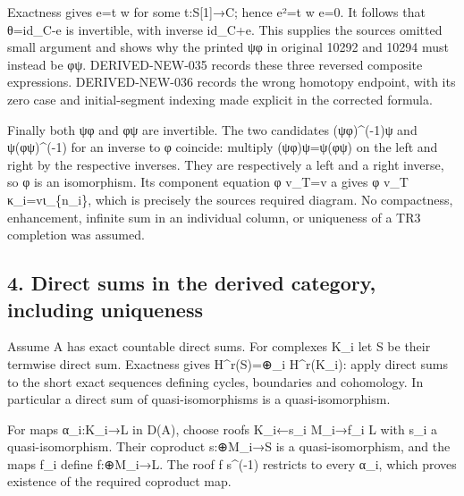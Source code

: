Exactness gives e\allowbreak{}=t w for some t:\allowbreak{}S[1]\allowbreak{}\allowbreak{}→C; hence e²\allowbreak{}=t w e\allowbreak{}=0. It follows that θ\allowbreak{}=id\_\allowbreak{}C-e is invertible,\allowbreak{} with inverse id\_\allowbreak{}C\allowbreak{}+e. This supplies the source\textquotesingle s omitted small argument and shows why the printed ψφ in original 10292 and 10294 must instead be φψ. DERIVED-NEW-035 records these three reversed composite expressions. DERIVED-NEW-036 records the wrong homotopy endpoint,\allowbreak{} with its zero case and initial-segment indexing made explicit in the corrected formula.

Finally both ψφ and φψ are invertible. The two candidates (ψφ)\allowbreak{}\textasciicircum{}(-1)\allowbreak{}ψ and ψ(φψ)\allowbreak{}\textasciicircum{}(-1)\allowbreak{} for an inverse to φ coincide:\allowbreak{} multiply (ψφ)\allowbreak{}ψ\allowbreak{}=ψ(φψ)\allowbreak{} on the left and right by the respective inverses. They are respectively a left and a right inverse,\allowbreak{} so φ is an isomorphism. Its component equation φ v\_\allowbreak{}T\allowbreak{}=v a gives φ v\_\allowbreak{}T κ\_\allowbreak{}i\allowbreak{}=vι\_\allowbreak{}\{n\_\allowbreak{}i\},\allowbreak{} which is precisely the source\textquotesingle s required diagram. No compactness,\allowbreak{} enhancement,\allowbreak{} infinite sum in an individual column,\allowbreak{} or uniqueness of a TR3 completion was assumed.

\subsection{\texorpdfstring{4. Direct sums in the derived category,\allowbreak{} including uniqueness}{4. Direct sums in the derived  including uniqueness}}\label{proofs-10139-10427-direct-sums-in-the-derived-category-including-uniqueness}

Assume A has exact countable direct sums. For complexes K\_\allowbreak{}i let S be their termwise direct sum. Exactness gives H\textasciicircum{}r(S)\allowbreak{}\allowbreak{}=\allowbreak{}⊕\_\allowbreak{}i H\textasciicircum{}r(K\_\allowbreak{}i)\allowbreak{}:\allowbreak{} apply direct sums to the short exact sequences defining cycles,\allowbreak{} boundaries and cohomology. In particular a direct sum of quasi-isomorphisms is a quasi-isomorphism.

For maps α\_\allowbreak{}i:\allowbreak{}K\_\allowbreak{}i\allowbreak{}→L in D(A)\allowbreak{},\allowbreak{} choose roofs K\_\allowbreak{}i←s\_\allowbreak{}i M\_\allowbreak{}i\allowbreak{}→f\_\allowbreak{}i L with s\_\allowbreak{}i a quasi-isomorphism. Their coproduct s:\allowbreak{}\allowbreak{}⊕M\_\allowbreak{}i\allowbreak{}→S is a quasi-isomorphism,\allowbreak{} and the maps f\_\allowbreak{}i define f:\allowbreak{}\allowbreak{}⊕M\_\allowbreak{}i\allowbreak{}→L. The roof f s\textasciicircum{}(-1)\allowbreak{} restricts to every α\_\allowbreak{}i,\allowbreak{} which proves existence of the required coproduct map.

